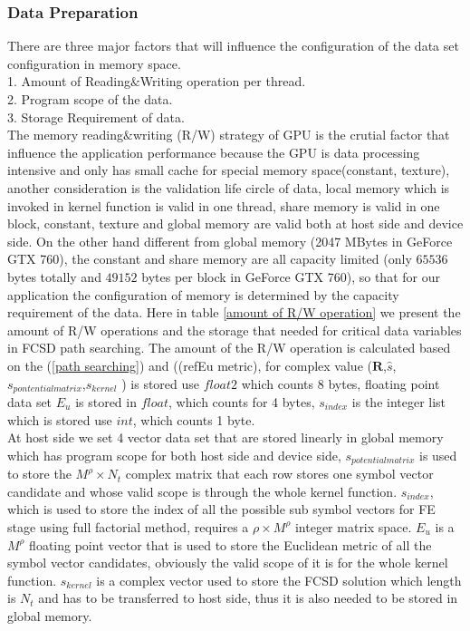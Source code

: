 \documentclass[12pt,a4paper,final]{article}
\begin{document}
\begin{spacing}{2.5}
\subsubsection{Data Preparation}
There are three major factors that will influence the configuration of the data set configuration in memory space.\\
1. Amount of Reading$\&$Writing operation per thread.\\
2. Program scope of the data.\\
3. Storage Requirement of data.\\
The memory reading$\&$writing (R/W) strategy of GPU is the crutial factor that influence the application performance because the GPU is data processing intensive and only has small cache for special memory space(constant, texture), another consideration is the validation life circle of data, local memory which is invoked in kernel function is valid in one thread, share memory is valid in one block, constant, texture and global memory are valid both at host side and device side. On the other hand different from global memory (2047 MBytes in GeForce GTX 760), the constant and share memory are all capacity limited (only $65536$ bytes totally and $49152$ bytes per block in GeForce GTX 760), so that for our application the configuration of memory is determined by the capacity requirement of the data. Here in table \ref{amount of R/W operation} we present the amount of R/W operations and the storage that needed for critical data variables in FCSD path searching. The amount of the R/W operation is calculated based on the (\ref{path searching}) and ((ref{Eu metric}), for complex value ($\mathbf{R}$,$\hat{s}$, $\mathit{s_{pontential matrix}}$,$\mathit{s_{kernel}}$ ) is stored use $\mathit{float2}$ which counts 8 bytes, floating point data set $E_{u}$ is stored in $\mathit{float}$, which counts for 4 bytes, $\mathit{s_{index}}$ is the integer list which is stored use $\mathit{int}$, which counts 1 byte. \\
 At host side we set 4 vector data set that are stored linearly in global memory which has program scope for both host side and device side, $\mathit{s_{potential matrix}}$ is used to store the $M^{\rho}\times N_{t}$ complex matrix that each row stores one symbol vector candidate and whose valid scope is through the whole kernel function. $\mathit{s_{index}}$, which is used to store the index of all the possible sub symbol vectors for  FE stage using full factorial method, requires a $\rho\times M^{\rho}$  integer matrix space.  $\mathit{E_{u}}$ is a $M^{\rho}$ floating point vector that is used to store the Euclidean metric of all the symbol vector candidates, obviously the valid scope of it is for the whole kernel function. $\mathit{s_{kernel}}$ is a complex vector used to store the FCSD solution which length is $N_{t}$ and has to be transferred to host side, thus it is also needed to be stored in global memory. \\

\end{spacing}
\end{document}
